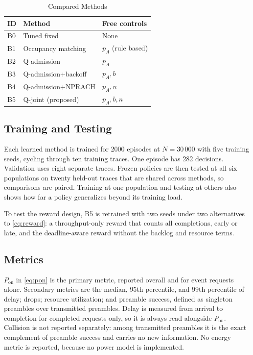 \documentclass[conference]{IEEEtran}
\begin{document}
\begin{table}[!t]
\caption{Compared Methods}
\label{tab:methods}
\centering
\begin{tabular}{@{}l l l@{}}
\hline
\textbf{ID} & \textbf{Method} & \textbf{Free controls} \\
\hline
B0 & Tuned fixed & None \\
B1 & Occupancy matching & $p_A$ (rule based) \\
B2 & Q-admission & $p_A$ \\
B3 & Q-admission+backoff & $p_A, b$ \\
B4 & Q-admission+NPRACH & $p_A, n$ \\
B5 & Q-joint (proposed) & $p_A, b, n$ \\
\hline
\end{tabular}
\end{table}

\subsection{Training and Testing}
Each learned method is trained for 2000 episodes at $N = 30\,000$ with five training
seeds, cycling through ten training traces. One episode has 282 decisions. Validation
uses eight separate traces. Frozen policies are then tested at all six populations
on twenty held-out traces that are shared across methods, so comparisons are paired.
Training at one population and testing at others also shows how far a policy
generalizes beyond its training load.

To test the reward design, B5 is retrained with two seeds under two alternatives to
\eqref{eq:reward}: a throughput-only reward that counts all completions, early or
late, and the deadline-aware reward without the backlog and resource terms.

\subsection{Metrics}
$P_{\mathrm{on}}$ in \eqref{eq:pon} is the primary metric, reported overall and for
event requests alone. Secondary metrics are the median, 95th percentile, and 99th
percentile of delay; drops; resource utilization; and preamble success, defined as
singleton preambles over transmitted preambles. Delay is measured from arrival to
completion for completed requests only, so it is always read alongside
$P_{\mathrm{on}}$. Collision is not reported separately: among transmitted preambles
it is the exact complement of preamble success and carries no new information. No
energy metric is reported, because no power model is implemented.
\end{document}
